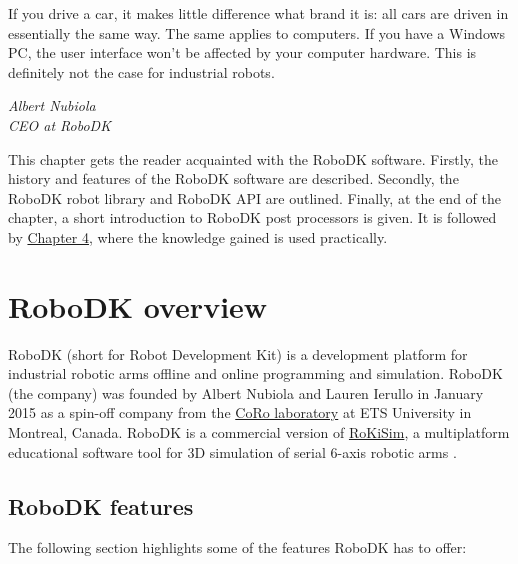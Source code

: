 \label{chap:design}

\epigraph{If you drive a car, it makes little difference what brand it is: all cars are driven
in essentially the same way. The same applies to computers. If you have a
Windows PC, the user interface won’t be affected by your computer hardware.
This is definitely not the case for industrial robots.}{\textit{Albert Nubiola \\ CEO at RoboDK}}

\par This chapter gets the reader acquainted with the RoboDK software. Firstly, the history and features of the RoboDK software are described. Secondly, the RoboDK robot library and RoboDK API are outlined. Finally, at the end of the chapter, a short introduction to RoboDK post processors is given. It is followed by  \hyperref[chap:implementation]{Chapter 4}, where the knowledge gained is used practically. 

\section{RoboDK overview}

RoboDK (short for Robot Development Kit) is a development platform for industrial robotic arms offline and online programming and simulation. 
RoboDK (the company) was founded by Albert Nubiola and Lauren Ierullo in January 2015 as a spin-off company from the \href{https://en.etsmtl.ca/unites-de-recherche/coro/accueil?lang=en-CA}{CoRo laboratory}   at ETS University in Montreal, Canada. RoboDK is a commercial version of \href{https://www.parallemic.org/RoKiSim.html}{RoKiSim}, a multiplatform educational software tool for 3D simulation of serial 6-axis robotic arms \cite{robodkoverview}.

\subsection{RoboDK features}

The following section highlights some of the features RoboDK has to offer: 

